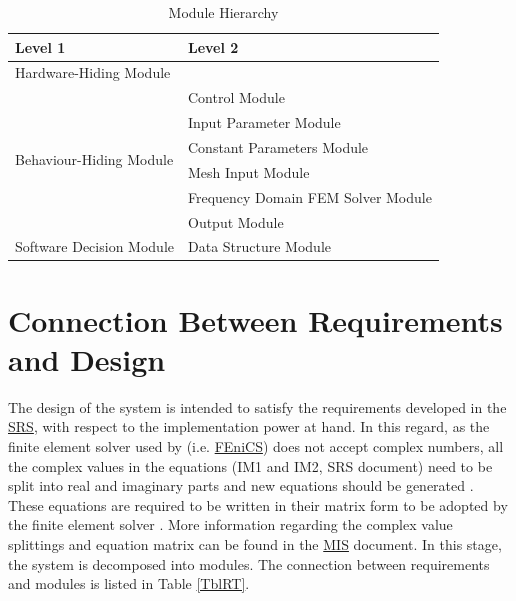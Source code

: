 \documentclass[12pt, titlepage]{article}
\begin{document}
	
	\begin{table}[h!] \centering \begin{tabular}{p{} p{}}
			\toprule \textbf{Level 1} & \textbf{Level 2}\\ \midrule
			
			{Hardware-Hiding Module} & ~ \\ \midrule
			
			\multirow{6}{0.3\textwidth}{Behaviour-Hiding Module} & \progname{} Control
			Module\\ & Input Parameter Module\\ & Constant Parameters Module\\ & Mesh
			Input Module\\ & Frequency Domain FEM Solver Module\\ & Output Module\\
			
			\midrule
			
			\multirow{1}{0.3\textwidth}{Software Decision Module} & Data Structure
			Module\\ \bottomrule
			
		\end{tabular} \caption{Module Hierarchy} \label{TblMH} \end{table}
	
	\section{Connection Between Requirements and Design} \label{SecConnection}
	
	The design of the system is intended to satisfy the requirements developed in
	the \href{https://github.com/shmouses/SPDFM/tree/master/docs/SRS}{SRS}, with
	respect to the implementation power at hand. In this regard, as the finite
	element solver used by \progname{} (i.e.
	\href{https://fenicsproject.org/}{FEniCS}) does not accept complex numbers, all
	the complex values in the equations (IM1 and IM2, SRS document) need to be
	split into real and imaginary parts and new equations should be generated
	\citep{rochlitz2019custem, otto2012using}. These equations are required to be
	written in their matrix form to be adopted by the finite element solver
	\citep{otto2012using}. More information regarding the complex value splittings
	and equation matrix can be found in the
	\href{https://github.com/shmouses/SPDFM/tree/master/docs/Design/MIS}{MIS}
	document. In this stage, the system is decomposed into modules. The connection
	between requirements and modules is listed in Table \ref{TblRT}.
	
\end{document}
